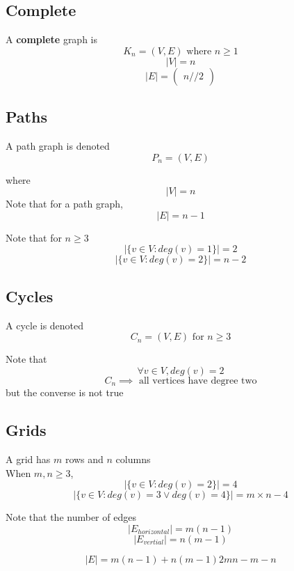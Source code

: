 \subsection{Complete}

\begin{framed}
   A \textbf{complete} graph is 
   \[
     K_n = (V, E) \text{ where } n \geq 1
   \] 
   \[
     |V| = n
   \] 
   \[
     |E| = \begin{pmatrix} n //2 \end{pmatrix} 
   \] 
  
\end{framed}

\subsection{Paths}
\begin{framed}
   A path graph is denoted  
   \[
     P_n = (V, E)
   \] 

   where
   \[
     |V| = n
   \] 
   Note that for a path graph, 
   \[
     |E| = n - 1
   \] 

   Note that for $ n \geq 3$ 
   \[
     \left| \{ v \in V : deg(v) = 1 \}  \right|  = 2
   \] 
   \[
     \left| \{ v \in V : deg(v) = 2 \}  \right|  = n - 2
   \] 
  
\end{framed}


\subsection{Cycles}
\begin{framed}
   A cycle is denoted
   \[
     C_n = (V, E) \text{ for } n \geq 3
   \] 


   Note that
   \[
     \forall v \in V, deg(v) = 2
   \] 
   \[
     C_n \implies \text{ all vertices have degree two}
   \] 
   but the converse is not true
\end{framed}

\subsection{Grids}
\begin{framed}
   A grid has $m$ rows and $n$ columns \\

   When  $m, n \geq 3$, 
   \[
    \left| \{ v \in V : deg(v) = 2 \}  \right|  = 4
   \] 
   \[
    \left| \{ v \in V : deg(v) = 3 \lor deg(v) = 4\}  \right|  = m \times n - 4
   \] 

   Note that the number of edges 
   \[
      |E_{horizontal} | = m(n-1)
   \] 
   \[
      |E_{vertial} | = n(m-1)
   \] 

   \[
     |E| = m(n-1) + n(m-1) 2mn -m - n
   \] 
\end{framed}

